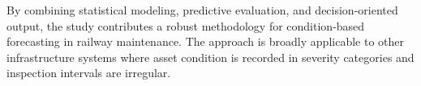 \documentclass{article}
\begin{document}
By combining statistical modeling, predictive evaluation, and decision-oriented output, the study contributes a robust methodology for condition-based forecasting in railway maintenance. The approach is broadly applicable to other infrastructure systems where asset condition is recorded in severity categories and inspection intervals are irregular.



\end{document}
